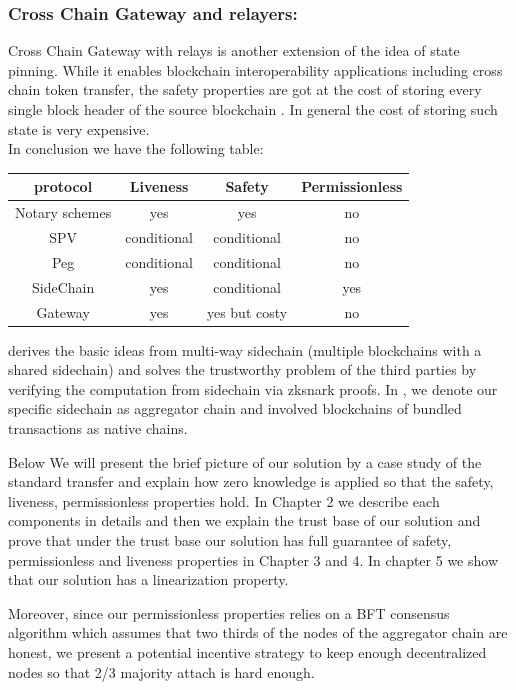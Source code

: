 \documentclass[pageno]{jpaper}
\begin{document}
\subsubsection{Cross Chain Gateway and relayers:}
    Cross Chain Gateway with relays is another extension of the idea of state pinning. While it enables blockchain interoperability applications including cross chain token transfer, the safety properties are got at the cost of storing every single block header of the source blockchain \cite{belchior2021survey}. In general the cost of storing such state is very expensive.
\\
\newline
In conclusion we have the following table:
\begin{table}[h]
\small
\centering
\begin{tabular}{ | c | c | c | c | }
\hline
protocol & Liveness & Safety & Permissionless \\
\hline
Notary schemes & yes & yes & no\\
\hline
SPV & conditional & conditional & no \\
\hline
Peg & conditional & conditional & no \\
\hline
SideChain & yes & conditional & yes \\ 
\hline
Gateway& yes & yes but costy & no \\ 
\hline
\end{tabular}
\end{table}

\dprotocol derives the basic ideas from multi-way sidechain (multiple blockchains with a shared sidechain) and solves the trustworthy problem of the third parties by verifying the computation from sidechain via zksnark proofs. In \dprotocol, we denote our specific sidechain as aggregator chain and involved blockchains of bundled transactions as native chains.

Below We will present the brief picture of our solution by a case study of the standard transfer and explain how zero knowledge is applied so that the safety, liveness, permissionless properties hold. In Chapter 2 we describe each components in details and then we explain the trust base of our solution and prove that under the trust base our solution has full guarantee of safety, permissionless and liveness properties in Chapter 3 and 4. In chapter 5 we show that our solution has a linearization property. 

Moreover, since our permissionless properties relies on a BFT consensus algorithm which assumes that two thirds of the nodes of the aggregator chain are honest, we present a potential incentive strategy to keep enough decentralized nodes so that 2/3 majority attach is hard enough.
\end{document}
